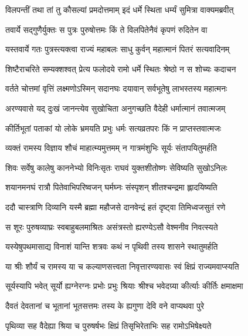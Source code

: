 
\twolineshloka
{विलपन्तीं तथा तां तु कौसल्यां प्रमदोत्तमाम्}
{इदं धर्मे स्थिता धर्म्यं सुमित्रा वाक्यमब्रवीत्} %

\twolineshloka
{तवार्ये सद्गुणैर्युक्तः स पुत्रः पुरुषोत्तमः}
{किं ते विलपितेनैवं कृपणं रुदितेन वा} %

\twolineshloka
{यस्तवार्ये गतः पुत्रस्त्यक्त्वा राज्यं महाबलः}
{साधु कुर्वन् महात्मानं पितरं सत्यवादिनम्} %

\twolineshloka
{शिष्टैराचरिते सम्यक्शश्वत् प्रेत्य फलोदये}
{रामो धर्मे स्थितः श्रेष्ठो न स शोच्यः कदाचन} %

\twolineshloka
{वर्तते चोत्तमां वृत्तिं लक्ष्मणोऽस्मिन् सदानघः}
{दयावान् सर्वभूतेषु लाभस्तस्य महात्मनः} %

\twolineshloka
{अरण्यवासे यद् दुःखं जानन्त्येव सुखोचिता}
{अनुगच्छति वैदेही धर्मात्मानं तवात्मजम्} %

\twolineshloka
{कीर्तिभूतां पताकां यो लोके भ्रमयति प्रभुः}
{धर्मः सत्यव्रतपरः किं न प्राप्तस्तवात्मजः} %

\twolineshloka
{व्यक्तं रामस्य विज्ञाय शौचं माहात्म्यमुत्तमम्}
{न गात्रमंशुभिः सूर्यः संतापयितुमर्हति} %

\twolineshloka
{शिवः सर्वेषु कालेषु काननेभ्यो विनिःसृतः}
{राघवं युक्तशीतोष्णः सेविष्यति सुखोऽनिलः} %

\twolineshloka
{शयानमनघं रात्रौ पितेवाभिपरिष्वजन्}
{घर्मघ्नः संस्पृशन् शीतश्चन्द्रमा ह्लादयिष्यति} %

\twolineshloka
{ददौ चास्त्राणि दिव्यानि यस्मै ब्रह्मा महौजसे}
{दानवेन्द्रं हतं दृष्ट्वा तिमिध्वजसुतं रणे} %

\twolineshloka
{स शूरः पुरुषव्याघ्रः स्वबाहुबलमाश्रितः}
{असंत्रस्तो ह्यरण्येऽसौ वेश्मनीव निवत्स्यते} %

\twolineshloka
{यस्येषुपथमासाद्य विनाशं यान्ति शत्रवः}
{कथं न पृथिवी तस्य शासने स्थातुमर्हति} %

\twolineshloka
{या श्रीः शौर्यं च रामस्य या च कल्याणसत्त्वता}
{निवृत्तारण्यवासः स्वं क्षिप्रं राज्यमवाप्स्यति} %

\twolineshloka
{सूर्यस्यापि भवेत् सूर्यो ह्यग्नेरग्नः प्रभोः प्रभुः}
{श्रियाः श्रीश्च भवेदग्र्या कीर्त्याः कीर्तिः क्षमाक्षमा} %

\twolineshloka
{दैवतं देवतानां च भूतानां भूतसत्तमः}
{तस्य के ह्यगुणा देवि वने वाप्यथवा पुरे} %

\twolineshloka
{पृथिव्या सह वैदेह्या श्रिया च पुरुषर्षभः}
{क्षिप्रं तिसृभिरेताभिः सह रामोऽभिषेक्ष्यते} %

